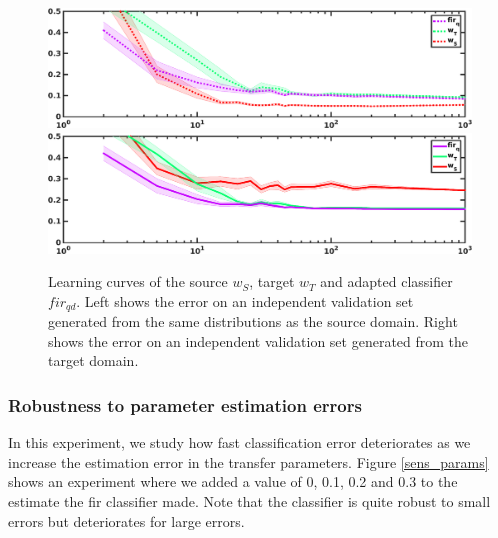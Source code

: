 \documentclass[twoside,11pt]{article}
\begin{document}
\begin{figure}[ht]
\centering
\includegraphics[width=1\textwidth]{images/learning_curveS.eps} \vspace{5px} \\
\includegraphics[width=1\textwidth]{images/learning_curveT.eps}
\caption{Learning curves of the source $w_{S}$, target $w_{T}$ and adapted classifier $fir_{qd}$. Left shows the error on an independent validation set generated from the same distributions as the source domain. Right shows the error on an independent validation set generated from the target domain.}
\label{lc}
\end{figure}

\subsubsection{Robustness to parameter estimation errors}
In this experiment, we study how fast classification error deteriorates as we increase the estimation error in the transfer parameters. Figure \ref{sens_params} shows an experiment where we added a value of 0, 0.1, 0.2 and 0.3 to the estimate the fir classifier made. Note that the classifier is quite robust to small errors but deteriorates for large errors.
\end{document}
